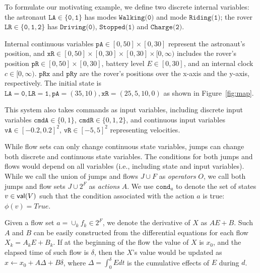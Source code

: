 \documentclass[sigconf]{acmart}
\begin{document}
\begin{example} 
To formulate our motivating example, we define two discrete internal variables: the astronaut $\texttt{LA} \in \{\texttt{0},\texttt{1}\}$ has modes $\texttt{Walking(0)}$ and mode $\texttt{Riding(1)}$; the rover $\texttt{LR} \in \{\texttt{0},\texttt{1},\texttt{2}\}$ has $\texttt{Driving(0)}$, $\texttt{Stopped(1)}$ and $\texttt{Charge(2)}$.

Internal continuous variables $\texttt{pA} \in [0,50]\times[0,30]$ represent the astronaut's position, and $\texttt{xR} \in [0,50]\times[0,30]\times[0,30] \times [0,\infty)$ includes the rover's position $\texttt{pR} \in [0,50]\times[0,30]$, battery level $E \in [0,30]$, and an internal clock $c \in [0, \infty)$. $\texttt{pRx}$ and $\texttt{pRy}$ are the rover's positions over the x-axis and the y-axis, respectively.  The initial state is $\texttt{LA}=\texttt{0},\texttt{LR}=\texttt{1},\texttt{pA}=(35,10),\texttt{xR}=(25,5,10,0)$ as shown in Figure~\ref{fig:map}. 

This system also takes commands as input variables, including discrete input variables $\texttt{cmdA} \in \{0,1\}$,  $\texttt{cmdR} \in \{0,1,2\}$, and continuous input variables $\texttt{vA} \in [-0.2,0.2]^2$, $\texttt{vR} \in [-5,5]^2$ representing velocities.%


\end{example}


While flow sets can only change continuous state variables, jumps can change both discrete and continuous state variables. The conditions for both jumps and flows would depend on all variables (i.e., including state and input variables). While we call the union of jumps and flows $J \cup F$ as \textit{operators} $O$, we call both jumps and flow sets $ J \cup 2^{F}$ as \textit{actions} $A$. We use $\texttt{cond}_a$ to denote the set of states $v \in {\mathsf{val}}(V)$ such that the condition associated with the action $a$ is true: $\phi(v) = True$. 


Given a flow set $a  = \cup_k f_k \in 2^{F}$, we denote the derivative of $X$ as $AE+B$. Such $A$ and $B$ can be easily constructed from the differential equations for each flow $X_k = A_k E + B_k$. 
If at the beginning of the flow the value of $X$ is $x_0$, and the elapsed time of such flow is $\delta$, then the $X$'s value would be updated as 
$x \gets x_0 + A \Delta + B\delta$, where $\Delta = \int_{0}^{\delta} E dt$ is the cumulative effects of $E$ during $d$. 
\end{document}
